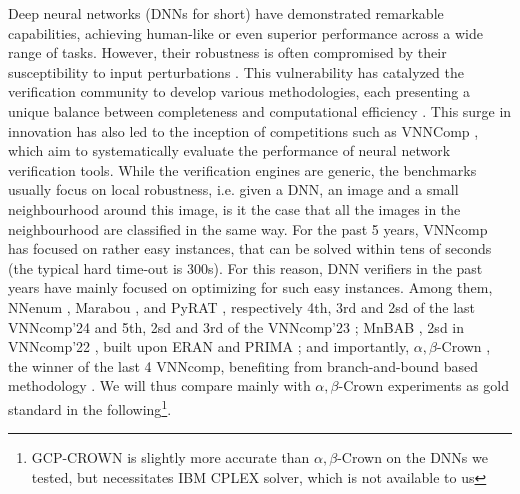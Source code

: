 Deep neural networks (DNNs for short) have demonstrated remarkable capabilities, achieving human-like or even superior performance across a wide range of tasks. However, their robustness is often compromised by their susceptibility to input perturbations \cite{szegedy}. This vulnerability has catalyzed the verification community to develop various methodologies, each presenting a unique balance between completeness and computational efficiency \cite{Marabou,Reluplex,deeppoly}. This surge in innovation has also led to the inception of competitions such as VNNComp \cite{VNNcomp}, which aim to systematically evaluate the performance of neural network verification tools. While the verification engines are generic, the benchmarks usually focus on local robustness, i.e. given a DNN, an image and a small neighbourhood around this image, is it the case that all the images in the neighbourhood are classified in the same way. 
For the past 5 years, VNNcomp has focused on rather easy instances, that can be solved within tens of seconds (the typical hard time-out is 300s). For this reason, DNN verifiers in the past years have mainly focused on optimizing for such easy instances. Among them, NNenum \cite{nnenum}, Marabou \cite{Marabou,Marabou2}, and PyRAT 
\cite{pyrat}, respectively 4th, 3rd and 2sd of the last VNNcomp'24 \cite{VNNcomp24}
and 5th, 2sd and 3rd  of the VNNcomp'23 \cite{VNNcomp23}; MnBAB \cite{ferrari2022complete}, 2sd in VNNcomp'22 \cite{VNNcomp22}, built upon ERAN \cite{deeppoly} and PRIMA \cite{prima}; and importantly, $\alpha,\beta$-Crown \cite{crown,xu2020fast}, the winner of the last 4 VNNcomp, benefiting from branch-and-bound based methodology \cite{cutting,BaB}.
We will thus compare mainly with $\alpha,\beta$-Crown experiments as gold standard in the following\footnote{GCP-CROWN \cite{cutting} is slightly more accurate than $\alpha,\beta$-Crown on the DNNs we tested, but necessitates IBM CPLEX solver, which is not available to us}.

